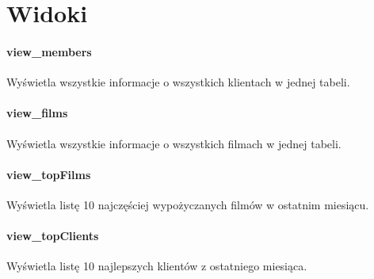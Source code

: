 \documentclass[12pt,a4paper,titlepage]{article}
\begin{document}

\section{Widoki}

\paragraph{view\_members}
Wyświetla wszystkie informacje o wszystkich klientach w jednej tabeli.

\paragraph{view\_films}
Wyświetla wszystkie informacje o wszystkich filmach w jednej tabeli.

\paragraph{view\_topFilms}
Wyświetla listę 10 najczęściej wypożyczanych filmów w ostatnim miesiącu.

\paragraph{view\_topClients}
Wyświetla listę 10 najlepszych klientów z ostatniego miesiąca.
\end{document}
